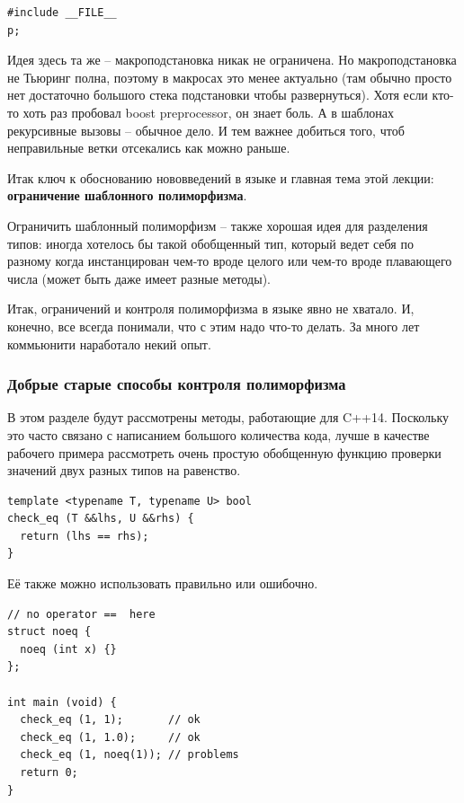 \documentclass[a4paper,12pt,oneside]{article}
\begin{document}
\begin{lstlisting}
#include __FILE__
p;
\end{lstlisting}

Идея здесь та же -- макроподстановка никак не ограничена. Но макроподстановка не Тьюринг полна, поэтому в макросах это менее актуально (там обычно просто нет достаточно большого стека подстановки чтобы развернуться). Хотя если кто-то хоть раз пробовал boost preprocessor, он знает боль. А в шаблонах рекурсивные вызовы -- обычное дело. И тем важнее добиться того, чтоб неправильные ветки отсекались как можно раньше.

Итак ключ к обоснованию нововведений в языке и главная тема этой лекции: \textbf{ограничение шаблонного полиморфизма}.

Ограничить шаблонный полиморфизм -- также хорошая идея для разделения типов: иногда хотелось бы такой обобщенный тип, который ведет себя по разному когда инстанцирован чем-то вроде целого или чем-то вроде плавающего числа (может быть даже имеет разные методы).

Итак, ограничений и контроля полиморфизма в языке явно не хватало. И, конечно, все всегда понимали, что с этим надо что-то делать. За много лет коммьюнити наработало некий опыт.

\subsubsection{Добрые старые способы контроля полиморфизма}

В этом разделе будут рассмотрены методы, работающие для C++14. Поскольку это часто связано с написанием большого количества кода, лучше в качестве рабочего примера рассмотреть очень простую обобщенную функцию проверки значений двух разных типов на равенство.

\begin{lstlisting}
template <typename T, typename U> bool
check_eq (T &&lhs, U &&rhs) {
  return (lhs == rhs);
}
\end{lstlisting}

Её также можно использовать правильно или ошибочно.

\begin{lstlisting}
// no operator ==  here
struct noeq {
  noeq (int x) {}
};

int main (void) {
  check_eq (1, 1);       // ok
  check_eq (1, 1.0);     // ok
  check_eq (1, noeq(1)); // problems
  return 0;
}
\end{lstlisting}
\end{document}
